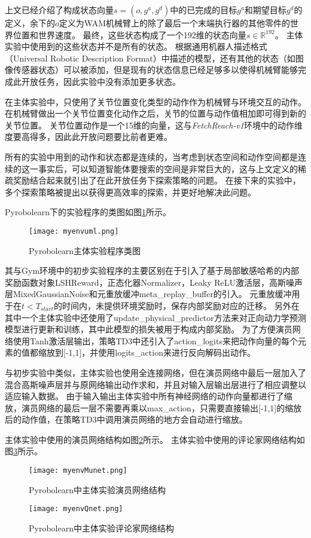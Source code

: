 上文已经介绍了构成状态向量$s=(o, g^a, g^d)$中的已完成的目标$g^a$和期望目标$g^d$的定义，余下的$o$定义为WAM机械臂上的除了最后一个末端执行器的其他零件的世界位置和世界速度。
最终，这些状态构成了一个192维的状态向量$s\in \mathbb R^{192}$。
主体实验中使用到的这些状态并不是所有的状态。
根据通用机器人描述格式（Universal Robotic Description Format）中描述的模型，还有其他的状态（如图像传感器状态）可以被添加，但是现有的状态信息已经足够多以使得机械臂能够完成此开放任务，因此实验中没有添加更多状态。

在主体实验中，只使用了关节位置变化类型的动作作为机械臂与环境交互的动作。
在机械臂做出一个关节位置变化动作之后，关节的位置与动作值相加即可得到新的关节位置。
关节位置动作是一个15维的向量，这与\emph{FetchReach-v1}环境中的动作维度要高得多，因此此开放问题要比前者更难。

所有的实验中用到的动作和状态都是连续的，当考虑到状态空间和动作空间都是连续的这一事实后，可以知道智能体要搜索的空间是非常巨大的，这与上文定义的稀疏奖励结合起来就引出了在此开放任务下探索策略的问题。
在接下来的实验中，多个探索策略被提出以获得更高效率的探索，并更好地解决此问题。

Pyrobolearn下的实验程序的类图如图\ref{myenvuml}所示。
    \begin{figure}
        \centering
        \texttt{[image: myenvuml.png]}
        \caption{Pyrobolearn主体实验程序类图}
        \label{myenvuml}
    \end{figure}
    其与Gym环境中的初步实验程序的主要区别在于引入了基于局部敏感哈希的内部奖励函数对象LSHReward，正态化器Normalizer，Leaky ReLU激活层，高斯噪声层MixedGaussianNoise和元重放缓冲meta\_replay\_buffer的引入。
    元重放缓冲用于在$t<T_{start}$的时间内，未提供环境奖励时，保存内部奖励对应的迁移。
    另外在其中一个主体实验中还使用了update\_physical\_predictor方法来对正向动力学预测模型进行更新和训练，其中此模型的损失被用于构成内部奖励。
    为了方便演员网络使用Tanh激活层输出，策略TD3中还引入了action\_logits来把动作向量的每个元素的值都缩放到[-1,1]，并使用logits\_action来进行反向解码出动作。

    与初步实验中类似，主体实验也使用全连接网络，但在演员网络中最后一层加入了混合高斯噪声层并与原网络输出动作求和，并且对输入层输出层进行了相应调整以适应输入数据。
    由于输入输出主体实验中所有神经网络的动作向量都进行了缩放，演员网络的最后一层不需要再乘以max\_action，只需要直接输出[-1,1]的缩放后的动作值，在策略TD3中调用演员网络的地方会自动进行缩放。

    主体实验中使用的演员网络结构如图\ref{myenvMunet}所示。
    主体实验中使用的评论家网络结构如图\ref{myenvQnet}所示。
    \begin{figure}
        \centering
        \texttt{[image: myenvMunet.png]}
        \caption{Pyrobolearn中主体实验演员网络结构}
        \label{myenvMunet}
    \end{figure}

    \begin{figure}
        \centering
        \texttt{[image: myenvQnet.png]}
        \caption{Pyrobolearn中主体实验评论家网络结构}
        \label{myenvQnet}
    \end{figure}
